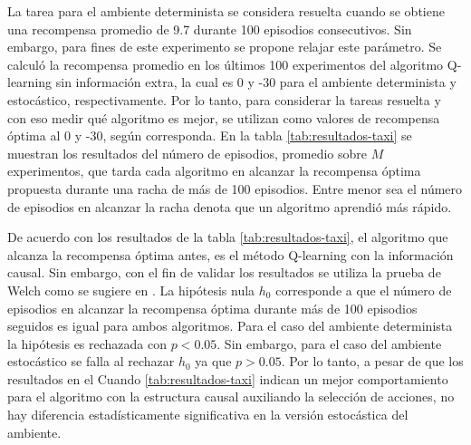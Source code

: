 La tarea para el ambiente determinista se considera resuelta cuando se obtiene una recompensa promedio de 9.7 durante 100 episodios consecutivos. Sin embargo, para fines de este experimento se propone relajar este parámetro. Se calculó la recompensa promedio en los últimos 100 experimentos del algoritmo Q-learning sin información extra, la cual es 0 y -30 para el ambiente determinista y estocástico, respectivamente. Por lo tanto, para considerar la tareas resuelta y con eso medir qué algoritmo es mejor, se utilizan como valores de recompensa óptima al 0 y -30, según corresponda. En la tabla \ref{tab:resultados-taxi} se muestran los resultados del número de episodios, promedio sobre $M$ experimentos,
que tarda cada algoritmo en alcanzar la recompensa óptima propuesta durante una racha de más de 100 episodios. Entre menor sea el número de episodios en alcanzar la racha denota que un algoritmo aprendió más rápido.

De acuerdo con los resultados de la tabla \ref{tab:resultados-taxi}, el algoritmo que alcanza la recompensa óptima antes, es el método Q-learning con la información causal. Sin embargo, con el fin de validar los resultados se utiliza la prueba de Welch como se sugiere en \cite{colas2019hitchhikers}. La hipótesis nula $h_0$ corresponde a que el número de episodios en alcanzar la recompensa óptima durante más de 100 episodios seguidos es igual para ambos algoritmos. Para el caso del ambiente determinista la hipótesis es rechazada con $p < 0.05$. Sin embargo, para el caso del ambiente estocástico se falla al rechazar $h_0$ ya que $p > 0.05$. Por lo tanto, a pesar de que los resultados en el Cuando 
\ref{tab:resultados-taxi} indican un mejor comportamiento para el algoritmo con la estructura causal auxiliando la selección de acciones, no hay diferencia estadísticamente significativa en la versión estocástica del ambiente.

